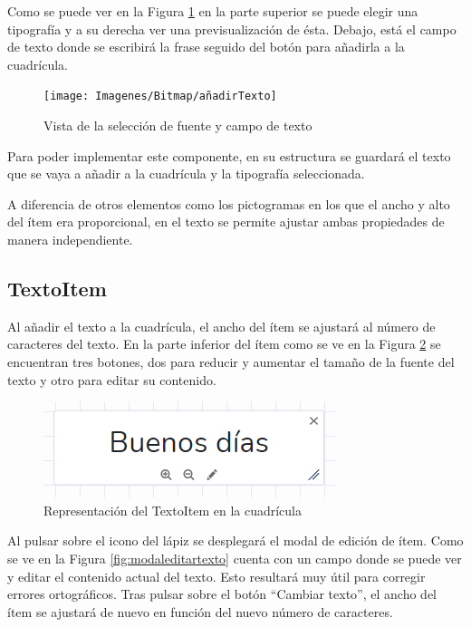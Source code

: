 Como se puede ver en la Figura \ref{fig:anadirtexto} en la parte superior se puede elegir una tipografía y a su derecha ver una previsualización de ésta. Debajo, está el campo de texto donde se escribirá la frase seguido del botón para añadirla a la cuadrícula.

\begin{figure}[h!]
	\centering
	\texttt{[image: Imagenes/Bitmap/añadirTexto]}
	\caption{Vista de la selección de fuente y campo de texto}
	\label{fig:anadirtexto}
\end{figure}


Para poder implementar este componente, en su estructura se guardará el texto que se vaya a añadir a la cuadrícula y la tipografía seleccionada.

A diferencia de otros elementos como los pictogramas en los que el ancho y alto del ítem era proporcional, en el texto se permite ajustar ambas propiedades de manera independiente.

\subsection{TextoItem}

Al añadir el texto a la cuadrícula, el ancho del ítem se ajustará al número de caracteres del texto. En la parte inferior del ítem como se ve en la Figura \ref{fig:fraseitem1} se encuentran tres botones, dos para reducir y aumentar el tamaño de la fuente del texto y otro para editar su contenido.

\begin{figure}[h!]
	\centering
	\includegraphics[width=0.7\linewidth]{Imagenes/Bitmap/fraseItem1}
	\caption{Representación del TextoItem en la cuadrícula}
	\label{fig:fraseitem1}
\end{figure}


Al pulsar sobre el icono del lápiz se desplegará el modal de edición de ítem. Como se ve en la Figura \ref{fig:modaleditartexto} cuenta con un campo donde se puede ver y editar el contenido actual del texto. Esto resultará muy útil para corregir errores ortográficos. Tras pulsar sobre el botón “Cambiar texto”, el ancho del ítem se ajustará de nuevo en función del nuevo número de caracteres.

